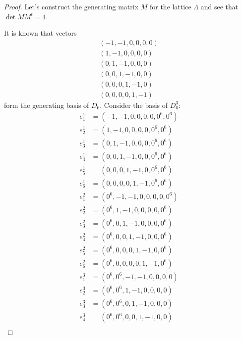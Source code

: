\documentclass{article}
\theoremstyle{plain}
\theoremstyle{definition}
\begin{document}
    \begin{proof}
        Let's construct the generating matrix $M$ for the lattice $\Lambda$ and see that 
        $\det MM^t=1$.

        It is known \cite{conway} that vectors
        \begin{align} 
            (-1, -1, 0, 0, 0, 0)    \nonumber \\
            (1, -1, 0, 0, 0, 0)     \nonumber \\
            (0, 1, -1, 0, 0, 0)     \nonumber \\
            (0, 0, 1, -1, 0, 0)     \nonumber \\
            (0, 0, 0, 1, -1, 0)     \nonumber \\
            (0, 0, 0, 0, 1, -1)
        \end{align}
        form the generating basis of $D_6$.
        Consider the basis of $D_6^3$:
        \begin{align}
            e^1_1&=(-1, -1, 0, 0, 0, 0, 0^6, 0^6)    \nonumber \\
            e^1_2&=(1, -1, 0, 0, 0, 0, 0^6, 0^6)     \nonumber \\
            e^1_3&=(0, 1, -1, 0, 0, 0, 0^6, 0^6)     \nonumber \\
            e^1_4&=(0, 0, 1, -1, 0, 0, 0^6, 0^6)     \nonumber \\
            e^1_5&=(0, 0, 0, 1, -1, 0, 0^6, 0^6)     \nonumber \\
            e^1_6&=(0, 0, 0, 0, 1, -1, 0^6, 0^6)     \nonumber \\
            e^2_1&=(0^6, -1, -1, 0, 0, 0, 0, 0^6)    \nonumber \\
            e^2_2&=(0^6, 1, -1, 0, 0, 0, 0, 0^6)     \nonumber \\
            e^2_3&=(0^6, 0, 1, -1, 0, 0, 0, 0^6)     \nonumber \\
            e^2_4&=(0^6, 0, 0, 1, -1, 0, 0, 0^6)     \nonumber \\
            e^2_5&=(0^6, 0, 0, 0, 1, -1, 0, 0^6)     \nonumber \\
            e^2_6&=(0^6, 0, 0, 0, 0, 1, -1, 0^6)     \nonumber \\
            e^3_1&=(0^6, 0^6, -1, -1, 0, 0, 0, 0)    \nonumber \\
            e^3_2&=(0^6, 0^6, 1, -1, 0, 0, 0, 0)     \nonumber \\
            e^3_3&=(0^6, 0^6, 0, 1, -1, 0, 0, 0)     \nonumber \\
            e^3_4&=(0^6, 0^6, 0, 0, 1, -1, 0, 0)     \nonumber \\

\end{align}
\end{proof}
\end{document}
